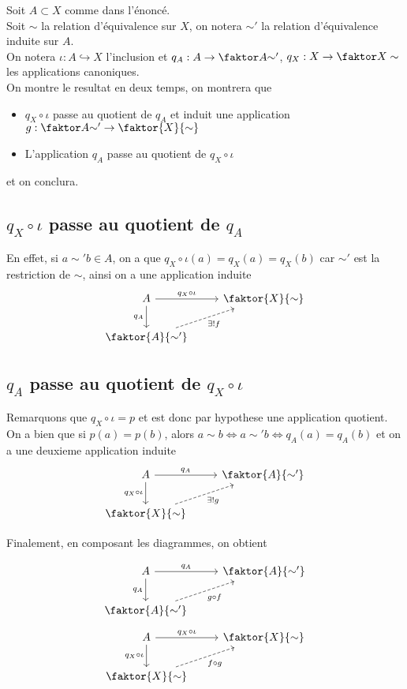 \documentclass[11pt, a4paper]{article}
\begin{document}
Soit $A \subset X$ comme dans l'énoncé.\\
Soit $\sim$ la relation d'équivalence sur $X$, on notera $\sim'$ la relation d'équivalence induite sur $A$.\\
On notera $\iota: A \hookrightarrow X$ l'inclusion et  $q_A: A \to \faktor A { \sim' }$, $q_X: X \to \faktor X \sim$ les applications canoniques.\\
On montre le resultat en deux temps, on montrera que
\begin{itemize}
\item $q_X\circ \iota$ passe au quotient de $q_A$ et induit une application $g: \faktor A { \sim' }\to \faktor { X} { \sim} $
\item L'application $q_A$ passe au quotient de $q_X\circ \iota$ 
\end{itemize}
et on conclura.
\subsection*{ $q_X \circ\iota$ passe au quotient de $q_A$ }
En effet, si $ a\sim' b\in A$, on a que $ q_X\circ \iota( a) = q_X( a) = q_X( b)  $ car $\sim'$ est la restriction de $\sim$, ainsi on a une application induite
\[\begin{tikzcd}
	A & {\faktor {X} {\sim}} \\
	{\faktor {A} {\sim'}}
	\arrow["{q_A}"', from=1-1, to=2-1]
	\arrow["{q_X\circ\iota}", from=1-1, to=1-2]
	\arrow["{\exists ! f}"', dashed, from=2-1, to=1-2]
\end{tikzcd}\]
\subsection*{ $q_A$ passe au quotient de $q_X\circ \iota$ }
Remarquons que $q_X \circ \iota= p$ et est donc par hypothese une application quotient.\\

On a bien que si $p ( a) = p( b) $, alors $a\sim b \iff a\sim' b \iff q_A( a) = q_A( b) $ et on a une deuxieme application induite 
\[\begin{tikzcd}
	A & { \faktor {A} {\sim'}} \\
	{\faktor {X} {\sim}}
	\arrow["{q_X\circ\iota}"', from=1-1, to=2-1]
	\arrow["{q_A}", from=1-1, to=1-2]
	\arrow["{\exists ! g}"', dashed, from=2-1, to=1-2]
\end{tikzcd}\]

Finalement, en composant les diagrammes, on obtient

\[\begin{tikzcd}
	A & { \faktor {A} {\sim'}} \\
	{\faktor {A} {\sim'}}
	\arrow["{q_A}"', from=1-1, to=2-1]
	\arrow["{q_A}", from=1-1, to=1-2]
	\arrow["{g\circ f}"', dashed, from=2-1, to=1-2]
\end{tikzcd}\]
\[\begin{tikzcd}
	A & {\faktor {X} {\sim}} \\
	{\faktor {X} {\sim}}
	\arrow["{q_X\circ\iota}"', from=1-1, to=2-1]
	\arrow["{q_X\circ\iota}", from=1-1, to=1-2]
	\arrow["{f\circ g}"', dashed, from=2-1, to=1-2]
\end{tikzcd}\]
\end{document}

